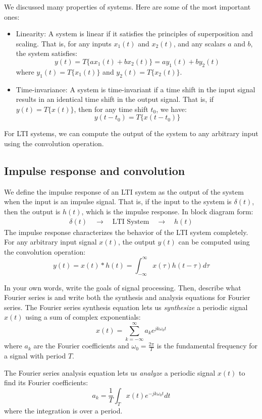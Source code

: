 We discussed many properties of systems. Here are some of the most important ones:
\begin{itemize}
\item Linearity: A system is linear if it satisfies the principles of superposition and scaling. That is, for any inputs $x_1(t)$ and $x_2(t)$, and any scalars $a$ and $b$, the system satisfies: 
\[
y(t) = T\{ax_1(t) + bx_2(t)\} = ay_1(t) + by_2(t)
\]
where $y_1(t) = T\{x_1(t)\}$ and $y_2(t) = T\{x_2(t)\}$.
\item Time-invariance: A system is time-invariant if a time shift in the input signal results in an identical time shift in the output signal. That is, if $y(t) = T\{x(t)\}$, then for any time shift $t_0$, we have: 
\[
y(t - t_0) = T\{x(t - t_0)\}
\]
\end{itemize}

For LTI systems, we can compute the output of the system to any arbitrary input using the convolution operation. 
\subsection{Impulse response and convolution}
We define the impulse response of an LTI system as the output of the system when the input is an impulse signal. That is, if the input to the system is $\delta(t)$, then the output is $h(t)$, which is the impulse response. In block diagram form:
\[
\begin{array}{c}
\delta(t) \quad \longrightarrow \quad \boxed{\text{LTI System}} \quad \longrightarrow \quad h(t)
\end{array}
\]
The impulse response characterizes the behavior of the LTI system completely. For any arbitrary input signal $x(t)$, the output $y(t)$ can be computed using the convolution operation:
\[
y(t) = x(t) * h(t) = \int_{-\infty}^{\infty} x(\tau) h(t - \tau) d\tau
\]

\begin{popquiz}
In your own words, write the goals of signal processing. Then, describe what Fourier series is and write both the synthesis and analysis equations for Fourier series.
\popqsplit
The Fourier series synthesis equation lets us \emph{synthesize} a periodic signal $x(t)$ using a sum of complex exponentials:
\[
x(t) = \sum_{k=-\infty}^{\infty} a_k e^{j k \omega_0 t}
\]
where $a_k$ are the Fourier coefficients and $\omega_0 = \frac{2\pi}{T}$ is the fundamental frequency for a signal with period $T$.

The Fourier series analysis equation lets us \emph{analyze} a periodic signal $x(t)$ to find its Fourier coefficients:
\[
a_k = \frac{1}{T} \int_{T} x(t) e^{-j k \omega_0 t} dt
\]
where the integration is over a period. 
\end{popquiz}


